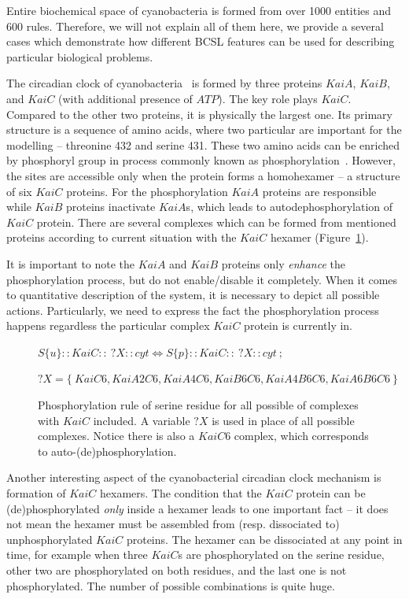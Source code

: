 \documentclass[12pt]{fithesis2}
\begin{document}
Entire biochemical space of cyanobacteria is formed from over 1000 entities and 600 rules. Therefore, we will not explain all of them here, we provide a several cases which demonstrate how different BCSL features can be used for describing particular biological problems.

The circadian clock of cyanobacteria~\cite{CCR} is formed by three proteins $KaiA$, $KaiB$, and $KaiC$ (with additional presence of $ATP$). The key role plays $KaiC$. Compared to the other two proteins, it is physically the largest one. Its primary structure is a sequence of amino acids, where two particular are important for the modelling -- threonine 432 and serine 431. These two amino acids can be enriched by phosphoryl group in process commonly known as phosphorylation~\cite{cohen2002origins}. However, the sites are accessible only when the protein forms a homohexamer -- a structure of six $KaiC$ proteins. For the phosphorylation $KaiA$ proteins are responsible while $KaiB$ proteins inactivate $KaiA$s, which leads to autodephosphorylation of $KaiC$ protein. There are several complexes which can be formed from mentioned proteins according to current situation with the $KaiC$ hexamer (Figure~\ref{phospho_rule}).

It is important to note the $KaiA$ and $KaiB$ proteins only \emph{enhance} the phosphorylation process, but do not enable/disable it completely. When it comes to quantitative description of the system, it is necessary to depict all possible actions. Particularly, we need to express the fact the phosphorylation process happens regardless the particular complex $KaiC$ protein is currently in. 

\begin{figure}[!h]
{\small
\begin{center}
$ S\{u\}::KaiC::~?X::cyt \Leftrightarrow S\{p\}::KaiC::~?X::cyt ~;~$

$ ?X = \{~KaiC6, KaiA2C6, KaiA4C6, KaiB6C6, KaiA4B6C6, KaiA6B6C6~\} $
\end{center}
}
\caption{Phosphorylation rule of serine residue for all possible of complexes with $KaiC$ included. A variable $?X$ is used in place of all possible complexes. Notice there is also a $KaiC6$ complex, which corresponds to auto-(de)phosphorylation.}\label{phospho_rule}
\end{figure}

Another interesting aspect of the cyanobacterial circadian clock mechanism is formation of $KaiC$ hexamers. The condition that the $KaiC$ protein can be (de)phosphorylated \emph{only} inside a hexamer leads to one important fact -- it does not mean the hexamer must be assembled from (resp. dissociated to) unphosphorylated $KaiC$ proteins. The hexamer can be dissociated at any point in time, for example when three $KaiC$s are phosphorylated on the serine residue, other two are phosphorylated on both residues, and the last one is not phosphorylated. The number of possible combinations is quite huge.
\end{document}
